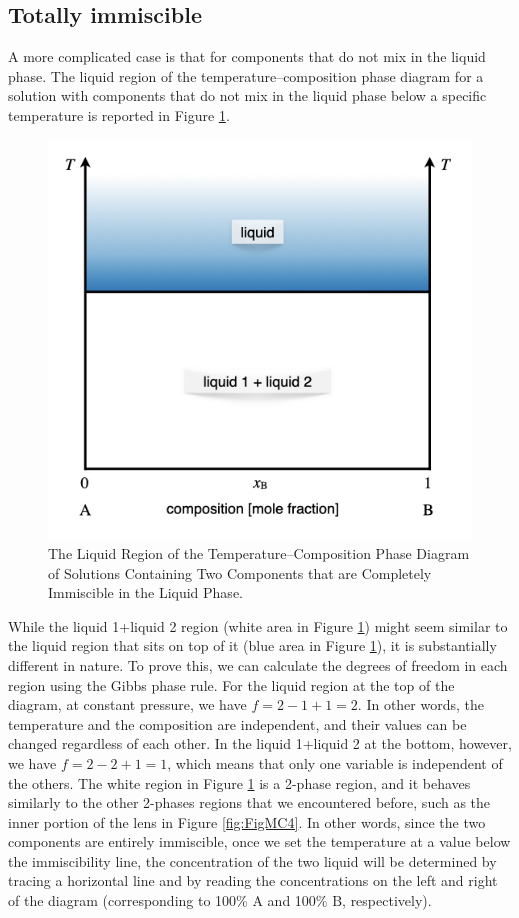 \documentclass[
  9pt,
]{extbook}
\theoremstyle{definition}
\theoremstyle{definition}
\theoremstyle{definition}
\theoremstyle{remark}
\begin{document}
\hypertarget{totally-immiscible}{%
\subsection{Totally immiscible}\label{totally-immiscible}}

A more complicated case is that for components that do not mix in the liquid phase. The liquid region of the temperature--composition phase diagram for a solution with components that do not mix in the liquid phase below a specific temperature is reported in Figure \ref{fig:FigMC9}.

\begin{figure}

{\centering \includegraphics[width=0.6\linewidth]{./img/OEP_Figures.027} 

}

\caption{The Liquid Region of the Temperature–Composition Phase Diagram of Solutions Containing Two Components that are Completely Immiscible in the Liquid Phase.}\label{fig:FigMC9}
\end{figure}

While the liquid 1+liquid 2 region (white area in Figure \ref{fig:FigMC9}) might seem similar to the liquid region that sits on top of it (blue area in Figure \ref{fig:FigMC9}), it is substantially different in nature. To prove this, we can calculate the degrees of freedom in each region using the Gibbs phase rule. For the liquid region at the top of the diagram, at constant pressure, we have \(f=2-1+1=2\). In other words, the temperature and the composition are independent, and their values can be changed regardless of each other. In the liquid 1+liquid 2 at the bottom, however, we have \(f=2-2+1=1\), which means that only one variable is independent of the others. The white region in Figure \ref{fig:FigMC9} is a 2-phase region, and it behaves similarly to the other 2-phases regions that we encountered before, such as the inner portion of the lens in Figure \ref{fig:FigMC4}. In other words, since the two components are entirely immiscible, once we set the temperature at a value below the immiscibility line, the concentration of the two liquid will be determined by tracing a horizontal line and by reading the concentrations on the left and right of the diagram (corresponding to 100\% \(\mathrm{A}\) and 100\% \(\mathrm{B}\), respectively).
\end{document}
